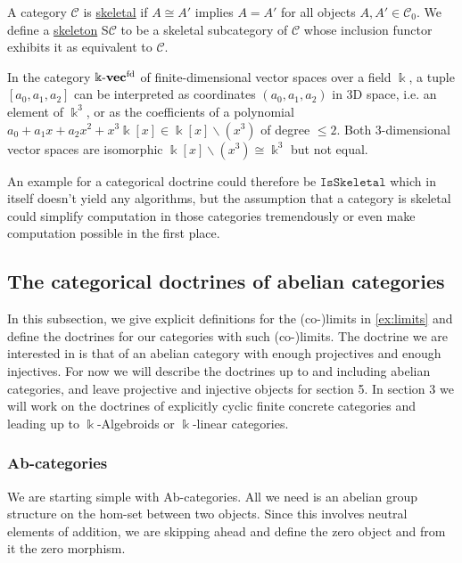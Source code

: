 \begin{definition}
A category $\mathcal{C}$ is \ul{skeletal} if $A \cong A'$ implies $A = A'$ for all objects $A, A' \in \mathcal{C}_{0}$.
We define a \ul{skeleton} S$\mathcal{C}$ to be a skeletal subcategory of $\mathcal{C}$ whose inclusion functor exhibits it
as equivalent to $\mathcal{C}$.
\end{definition}

\begin{example}
In the category $\Bbbk\textnormal{-}\mathbf{vec}^{\text{fd}}$ of finite-dimensional vector spaces over a field $\Bbbk$,
a tuple $[a_{0},a_{1},a_{2}]$ can be interpreted as coordinates $(a_{0},a_{1},a_{2})$ in $3$D space, i.e. an element of $\Bbbk^{3}$, or
as the coefficients of a polynomial $a_{0} + a_{1}x + a_{2}x^{2} + x^{3}\Bbbk[x] \in \Bbbk[x] \backslash (x^{3})$ of degree
$\leq 2$. Both $3$-dimensional vector spaces are isomorphic $\Bbbk[x] \backslash (x^{3}) \cong \Bbbk^{3}$ but not equal.
\end{example}

An example for a categorical doctrine could therefore be $\mathtt{IsSkeletal}$ which in itself doesn't yield any algorithms,
but the assumption that a category is skeletal could simplify computation in those categories tremendously or even make computation
possible in the first place.

\subsection{The categorical doctrines of abelian categories}

In this subsection, we give explicit definitions for the (co-)limits in \ref{ex:limits} and define the
doctrines for our categories with such (co-)limits. The doctrine we are interested in is that of an abelian category with
enough projectives and enough injectives. For now we will describe the doctrines up to and including abelian categories, and
leave projective and injective objects for section 5. In section 3 we will work on the doctrines of explicitly cyclic finite concrete
categories and leading up to $\Bbbk$-Algebroids or $\Bbbk$-linear categories.

\subsubsection{Ab-categories}
We are starting simple with Ab-categories. All we need is an abelian group structure on the hom-set between two objects.
Since this involves neutral elements of addition, we are skipping ahead and define the zero object and from it the zero morphism.

